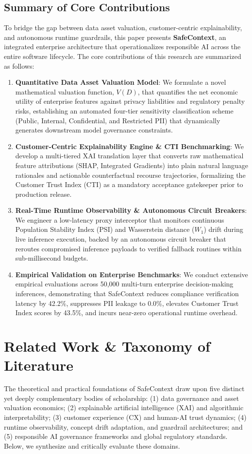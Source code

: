 \documentclass[journal]{IEEEtran}
\begin{document}
\subsection{Summary of Core Contributions}
To bridge the gap between data asset valuation, customer-centric explainability, and autonomous runtime guardrails, this paper presents \textbf{SafeContext}, an integrated enterprise architecture that operationalizes responsible AI across the entire software lifecycle. The core contributions of this research are summarized as follows:
\begin{enumerate}
    \item \textbf{Quantitative Data Asset Valuation Model}: We formulate a novel mathematical valuation function, $V(D)$, that quantifies the net economic utility of enterprise features against privacy liabilities and regulatory penalty risks, establishing an automated four-tier sensitivity classification scheme (Public, Internal, Confidential, and Restricted PII) that dynamically generates downstream model governance constraints.
    \item \textbf{Customer-Centric Explainability Engine \& CTI Benchmarking}: We develop a multi-tiered XAI translation layer that converts raw mathematical feature attributions (SHAP, Integrated Gradients) into plain natural language rationales and actionable counterfactual recourse trajectories, formalizing the Customer Trust Index (CTI) as a mandatory acceptance gatekeeper prior to production release.
    \item \textbf{Real-Time Runtime Observability \& Autonomous Circuit Breakers}: We engineer a low-latency proxy interceptor that monitors continuous Population Stability Index (PSI) and Wasserstein distance ($W_1$) drift during live inference execution, backed by an autonomous circuit breaker that reroutes compromised inference payloads to verified fallback routines within sub-millisecond budgets.
    \item \textbf{Empirical Validation on Enterprise Benchmarks}: We conduct extensive empirical evaluations across 50,000 multi-turn enterprise decision-making inferences, demonstrating that SafeContext reduces compliance verification latency by 42.2\%, suppresses PII leakage to 0.0\%, elevates Customer Trust Index scores by 43.5\%, and incurs near-zero operational runtime overhead.
\end{enumerate}

\section{Related Work \& Taxonomy of Literature}
The theoretical and practical foundations of SafeContext draw upon five distinct yet deeply complementary bodies of scholarship: (1) data governance and asset valuation economics; (2) explainable artificial intelligence (XAI) and algorithmic interpretability; (3) customer experience (CX) and human-AI trust dynamics; (4) runtime observability, concept drift adaptation, and guardrail architectures; and (5) responsible AI governance frameworks and global regulatory standards. Below, we synthesize and critically evaluate these domains.
\end{document}
